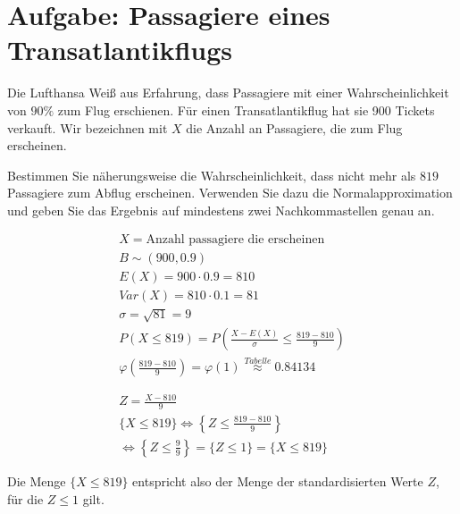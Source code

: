 \section{Aufgabe: Passagiere eines Transatlantikflugs}

Die Lufthansa Weiß aus Erfahrung, dass Passagiere mit einer Wahrscheinlichkeit
von $90\%$ zum Flug erschienen. Für einen Transatlantikflug hat sie 900 Tickets
verkauft. Wir bezeichnen mit $X$ die Anzahl an Passagiere, die zum Flug
erscheinen.

Bestimmen Sie näherungsweise die Wahrscheinlichkeit, dass nicht mehr als $819$
Passagiere zum Abflug erscheinen. Verwenden Sie dazu die Normalapproximation
und geben Sie das Ergebnis auf mindestens zwei Nachkommastellen genau an.

\begin{align*}
    X = \text{Anzahl passagiere die erscheinen}                                             \\
    B \sim (900, 0.9)                                                                       \\
    E(X) = 900 \cdot 0.9 = 810                                                              \\
    Var(X) = 810 \cdot 0.1 = 81                                                             \\
    \sigma = \sqrt{81} = 9                                                                  \\
    P(X \leq 819) = P\left(\frac{X - E(X)}{\sigma} \leq \frac{819 - 810}{9}\right)          \\
    \varphi\left(\frac{819 - 810}{9}\right) = \varphi(1) \overset{Tabelle}{\approx} 0.84134 \\\\\\
    Z = \frac{X - 810}{9} \\
    \{ X \leq 819 \} 
    \iff \left\{ Z \leq \frac{819 - 810}{9} \right\} \\[6pt]
    \iff \left\{ Z \leq \frac{9}{9} \right\} = \{ Z \leq 1 \} = \{ X \leq 819 \}
\end{align*}

Die Menge \( \{ X \leq 819 \} \) entspricht also der Menge der standardisierten Werte \( Z \), für die \( Z \leq 1 \) gilt.